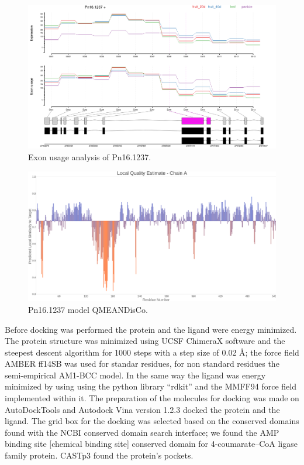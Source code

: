 \documentclass[12pt]{article}
\begin{document}
	\FloatBarrier
	\begin{figure}
		\centering
		\includegraphics[width=\textwidth-50pt]{../6/known/Transcripts/7.png}
		\caption{\centering Exon usage analysis of Pn16.1237.}
		\label{fig6k_1}
	\end{figure}
	\FloatBarrier
	
	\FloatBarrier
	\begin{figure}
		\centering
		\includegraphics[width=\textwidth-50pt]{../6/known/Swiss/Local_quality_estimate.png}
		\caption{\centering Pn16.1237 model QMEANDisCo.}
		\label{fig6k_3}
	\end{figure}
	\FloatBarrier
	
	\newpage
	
	Before docking was performed the protein and the ligand were energy minimized. The protein structure was minimized using UCSF ChimeraX software \cite{chimera,chimera_2} and the steepest descent algorithm for 1000 steps with a step size of 0.02 \r{A}; the force field AMBER ff14SB was used for standar residues, for non standard residues the semi-empirical AM1-BCC model. \cite{am1_bcc,am1_bcc_2,am1_bcc_3} In the same way the ligand was energy minimized by using using the python library ``rdkit'' and the MMFF94 force field implemented within it. \cite{rdkit,rdkit_mmff}	The preparation of the molecules for docking was made on AutoDockTools and Autodock Vina version 1.2.3 docked the protein and the ligand. \cite{adt,vina,vina_2} The grid box for the docking was selected based on the conserved domains found with the NCBI conserved domain search interface; we found the AMP binding site [chemical binding site] conserved domain for 4-coumarate--CoA ligase family protein. \cite{cdd,cdd_2}  CASTp3 found the protein's pockets.
	
\end{document}
